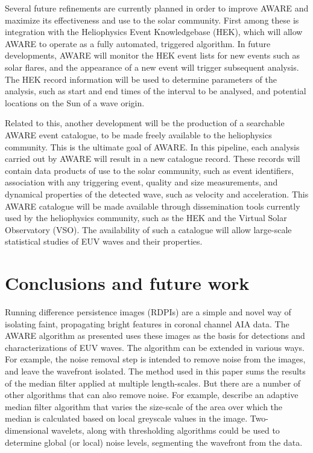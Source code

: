 \documentclass[referee,a4paper,12pt,traditabstract]{swsc}
\begin{document}
\begin{linenumbers}
Several future refinements are currently planned in order to improve
AWARE and maximize its effectiveness and use to the solar
community. First among these is integration with the Heliophysics
Event Knowledgebase (HEK), which will allow AWARE to operate as a
fully automated, triggered algorithm. In future developments, AWARE
will monitor the HEK event lists for new events such as solar flares,
and the appearance of a new event will trigger subsequent
analysis. The HEK record information will be used to determine
parameters of the analysis, such as start and end times of the
interval to be analysed, and potential locations on the Sun of a wave
origin.

Related to this, another development will be the production of a
searchable AWARE event catalogue, to be made freely available to the
heliophysics community. This is the ultimate goal of AWARE. In this
pipeline, each analysis carried out by AWARE will result in a new
catalogue record. These records will contain data products of use to
the solar community, such as event identifiers, association with any
triggering event, quality and size measurements, and dynamical
properties of the detected wave, such as velocity and
acceleration. This AWARE catalogue will be made available through
dissemination tools currently used by the heliophysics community, such
as the HEK and the Virtual Solar Observatory (VSO). The availability
of such a catalogue will allow large-scale statistical studies of EUV
waves and their properties.

\section{Conclusions and future work}\label{sec:conclusions}

Running difference persistence images (RDPIs) are a simple and novel
way of isolating faint, propagating bright features in coronal channel
AIA data.  The AWARE algorithm as presented uses these images as the
basis for detections and characterizations of EUV waves.  The
algorithm can be extended in various ways.  For example, the noise
removal step is intended to remove noise from the images, and leave
the wavefront isolated.  The method used in this paper sums the
results of the median filter applied at multiple length-scales.  But
there are a number of other algorithms that can also remove noise.
For example, \citet{2002dip..book.....G} describe an adaptive median
filter algorithm that varies the size-scale of the area over which
the median is calculated based on local greyscale values in the
image. Two-dimensional wavelets, along with thresholding algorithms
could be used to determine global (or local) noise levels, segmenting
the wavefront from the data.


\end{linenumbers}
\end{document}

